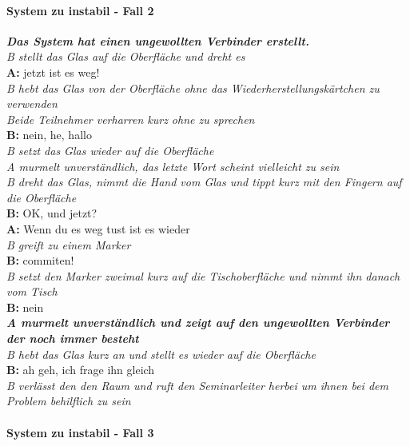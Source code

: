 \paragraph{System zu instabil - Fall 2}

\begin{transkript}
\emph{\textbf{Das System hat einen ungewollten Verbinder erstellt.}} \\
\emph{B stellt das Glas auf die Oberfläche und dreht es} \\
\textbf{A:} jetzt ist es weg! \\
\emph{B hebt das Glas von der Oberfläche ohne das Wiederherstellungskärtchen zu verwenden} \\
\emph{Beide Teilnehmer verharren kurz ohne zu sprechen} \\
\textbf{B:} nein, he, hallo \\
\emph{B setzt das Glas wieder auf die Oberfläche} \\
\emph{A murmelt unverständlich, das letzte Wort scheint vielleicht zu sein} \\
\emph{B dreht das Glas, nimmt die Hand vom Glas und tippt kurz mit den Fingern auf die Oberfläche} \\
\textbf{B:} OK, und jetzt? \\
\textbf{A:} Wenn du es weg tust ist es wieder \\
\emph{B greift zu einem Marker} \\
\textbf{B:} commiten! \\
\emph{B setzt den Marker zweimal kurz auf die Tischoberfläche und nimmt ihn danach vom Tisch} \\
\textbf{B:} nein \\
\emph{\textbf{A murmelt unverständlich und zeigt auf den ungewollten Verbinder der noch immer besteht}} \\
\emph{B hebt das Glas kurz an und stellt es wieder auf die Oberfläche} \\
\textbf{B:} ah geh, ich frage ihn gleich \\
\emph{B verlässt den den Raum und ruft den Seminarleiter herbei um ihnen bei dem Problem behilflich zu sein} \\
\end{transkript}

\paragraph{System zu instabil - Fall 3}

